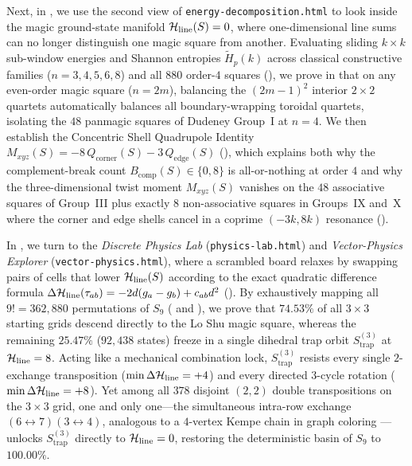 Next, in , we use the second view of \texttt{energy-decomposition.html} to look inside the magic ground-state manifold $\mathcal{H}_{\mathrm{line}}(S) = 0$, where one-dimensional line sums can no longer distinguish one magic square from another. Evaluating sliding $k\times k$ sub-window energies and Shannon entropies $\widetilde{H}_p(k)$ across classical constructive families ($n=3,4,5,6,8$) and all $880$ order-$4$ squares (), we prove in  that on any even-order magic square ($n=2m$), balancing the $(2m-1)^2$ interior $2\times 2$ quartets automatically balances all boundary-wrapping toroidal quartets, isolating the $48$ panmagic squares of Dudeney Group~I at $n=4$. We then establish the Concentric Shell Quadrupole Identity $M_{xyz}(S) = -8\,Q_{\mathrm{corner}}(S) - 3\,Q_{\mathrm{edge}}(S)$ (), which explains both why the complement-break count $B_{\mathrm{comp}}(S) \in \{0,8\}$ is all-or-nothing at order $4$ and why the three-dimensional twist moment $M_{xyz}(S)$ vanishes on the $48$ associative squares of Group~III plus exactly $8$ non-associative squares in Groups~IX and~X where the corner and edge shells cancel in a coprime $(-3k, 8k)$ resonance ().

In , we turn to the \emph{Discrete Physics Lab} (\texttt{physics-lab.html}) and \emph{Vector-Physics Explorer} (\texttt{vector-physics.html}), where a scrambled board relaxes by swapping pairs of cells that lower $\mathcal{H}_{\mathrm{line}}(S)$ according to the exact quadratic difference formula $\Delta\mathcal{H}_{\mathrm{line}}(\tau_{ab}) = -2d(g_a-g_b) + c_{ab}d^2$ (). By exhaustively mapping all $9! = 362{,}880$ permutations of $S_9$ ( and ), we prove that $74.53\%$ of all $3\times 3$ starting grids descend directly to the Lo Shu magic square, whereas the remaining $25.47\%$ ($92{,}438$ states) freeze in a single dihedral trap orbit $S_{\mathrm{trap}}^{(3)}$ at $\mathcal{H}_{\mathrm{line}} = 8$. Acting like a mechanical combination lock, $S_{\mathrm{trap}}^{(3)}$ resists every single $2$-exchange transposition ($\min\Delta\mathcal{H}_{\mathrm{line}} = +4$) and every directed $3$-cycle rotation ($\min\Delta\mathcal{H}_{\mathrm{line}} = +8$). Yet among all $378$ disjoint $(2,2)$ double transpositions on the $3\times 3$ grid, one and only one---the simultaneous intra-row exchange $(6\leftrightarrow 7)(3\leftrightarrow 4)$, analogous to a $4$-vertex Kempe chain in graph coloring \cite{kempe1879geographical}---unlocks $S_{\mathrm{trap}}^{(3)}$ directly to $\mathcal{H}_{\mathrm{line}}=0$, restoring the deterministic basin of $S_9$ to $100.00\%$.

